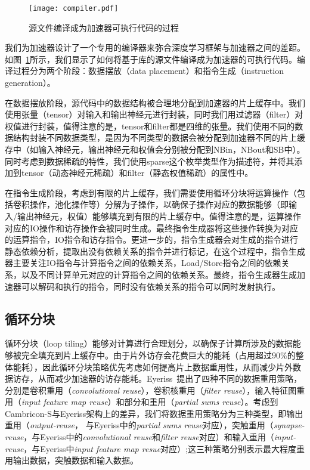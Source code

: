\begin{figure}[h]

\centering
\texttt{[image: compiler.pdf]}
\caption{源文件编译成为加速器可执行代码的过程}
\label{fig:compiler}
\end{figure}

我们为加速器设计了一个专用的编译器来弥合深度学习框架与加速器之间的差距。如图~\ref{fig:compiler}所示，我们显示了如何将基于库的源文件编译成为加速器的可执行代码。编译过程分为两个阶段：数据摆放（data placement）和指令生成（instruction generation）。

在数据摆放阶段，源代码中的数据结构被合理地分配到加速器的片上缓存中。我们使用张量（tensor）对输入和输出神经元进行封装，同时我们用过滤器（filter）对权值进行封装，值得注意的是，tensor和filter都是四维的张量。我们使用不同的数据结构封装不同数据类型，是因为不同类型的数据会被分配到加速器不同的片上缓存中（如输入神经元，输出神经元和权值会分别被分配到NBin，NBout和SB中）。同时考虑到数据稀疏的特性，我们使用sparse这个枚举类型作为描述符，并将其添加到tensor（动态神经元稀疏）和filter（静态权值稀疏）的属性中。

在指令生成阶段，考虑到有限的片上缓存，我们需要使用循环分块将运算操作（包括卷积操作，池化操作等）分解为子操作，以确保子操作对应的数据能够（即输入/输出神经元，权值）能够填充到有限的片上缓存中。值得注意的是，运算操作对应的IO操作和访存操作会被同时生成。最终指令生成器将这些操作转换为对应的运算指令，IO指令和访存指令。更进一步的，指令生成器会对生成的指令进行静态依赖分析，提取出没有依赖关系的指令并进行标记，在这个过程中，指令生成器主要关注IO指令与计算指令之间的依赖关系，Load/Store指令之间的依赖关系，以及不同计算单元对应的计算指令之间的依赖关系。最终，指令生成器生成加速器可以解码和执行的指令，同时没有依赖关系的指令可以同时发射执行。

\subsection{循环分块}

循环分块（loop tiling）能够对计算进行合理划分，以确保子计算所涉及的数据能够被完全填充到片上缓存中。由于片外访存会花费巨大的能耗（占用超过$90\%$的整体能耗），因此循环分块策略优先考虑如何提高片上数据重用性，从而减少片外数据访存，从而减少加速器的访存能耗。Eyeriss~\cite{chen2017eyeriss}提出了四种不同的数据重用策略，分别是卷积重用（\emph{convolutional reuse}），卷积核重用（\emph{filter reuse}），输入特征图重用（\emph{input feature map reuse}）和部分和重用（\emph{partial sums reuse}）。考虑到Cambricon-S与Eyeriss架构上的差异，我们将数据重用策略分为三种类型，即输出重用（\emph{output-reuse}， 与Eyeriss中的\emph{partial sums reuse}对应），突触重用（\emph{synapse-reuse}，与Eyeriss中的\emph{convolutional reuse}和\emph{filter reuse}对应）和输入重用（\emph{input-reuse}，与Eyeriss中\emph{input feature map resue}对应）;这三种策略分别表示最大程度重用输出数据，突触数据和输入数据。

